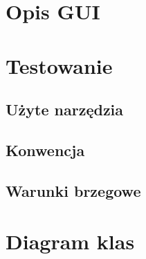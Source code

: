 \documentclass[]{article}
\begin{document}
    
    \section{Opis GUI} %
    
    
    \section{Testowanie} %
        \subsection{Użyte narzędzia}
        \subsection{Konwencja}
        \subsection{Warunki brzegowe}
      
    
    \section{Diagram klas} %
\end{document}
